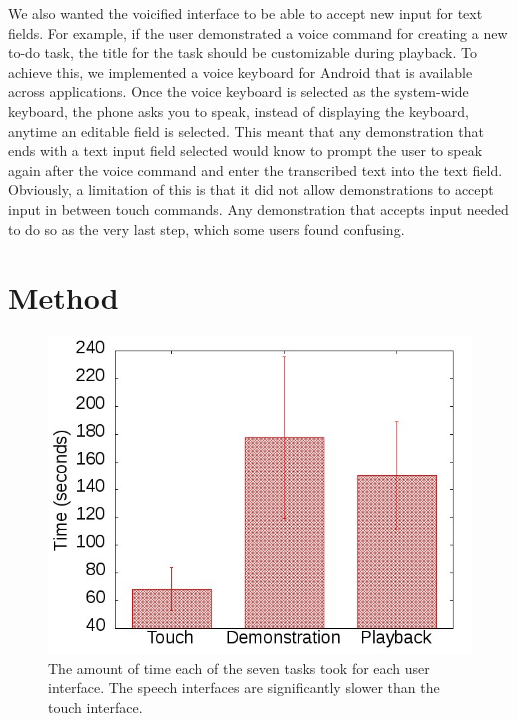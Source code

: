 \documentclass[letterpaper]{article}
\begin{document}
We also wanted the voicified interface to be able to accept new input for text fields. For 
example, if the user demonstrated a voice command for creating a new to-do task, the title for the task should be customizable during
playback. To achieve this, we implemented a voice keyboard for Android that is available across applications. 
Once the voice keyboard is selected as the system-wide keyboard, the phone asks you to speak, instead of displaying the keyboard, anytime an editable field is selected. 
This meant that any demonstration that ends with a text input field selected would know to prompt the user to speak again after 
the voice command and enter the transcribed text into the text field. Obviously, a limitation of this is that it did not allow 
demonstrations to accept input in between touch commands. Any demonstration that accepts input needed to do so as the very last step, which
some users found confusing.




\section{Method}

\begin{figure}[t]
\begin{center}
\includegraphics[scale=0.4]{fig/results.jpg}
\end{center}
\caption{The amount of time each of the seven tasks took for each user interface. The speech interfaces are significantly slower than the touch interface.}
\label{fig:results}
\end{figure}
\end{document}
